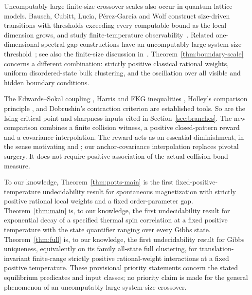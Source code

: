 Uncomputably large finite-size crossover scales also occur in quantum lattice models. Bausch, Cubitt, Lucia, P\'erez-Garc\'ia and Wolf construct size-driven transitions with thresholds exceeding every computable bound as the local dimension grows, and study finite-temperature observability~\cite{BCLPW2018}. Related one-dimensional spectral-gap constructions have an uncomputably large system-size threshold~\cite{BCLPG2020}; see also the finite-size discussion in~\cite{CPGW}. Theorem~\ref{thm:boundary-scale} concerns a different combination: strictly positive classical rational weights, uniform disordered-state bulk clustering, and the oscillation over all visible and hidden boundary conditions.

The Edwards--Sokal coupling \cite{ES}, Harris and FKG inequalities \cite{Harris,FKG}, Holley's comparison principle \cite{Holley}, and Dobrushin's contraction criterion \cite{Dobrushin,Rebeschini} are established tools. So are the Ising critical-point and sharpness inputs cited in Section~\ref{sec:branches}. The new comparison combines a finite collision witness, a positive closed-pattern reward and a covariance interpolation. The reward acts as an essential diminishment, in the sense motivating \cite{AG,BGK} and \cite[Conjecture 1 and Theorems 2--3]{BBR}; our anchor-covariance interpolation replaces pivotal surgery. It does not require positive association of the actual collision bond measure.

To our knowledge, Theorem~\ref{thm:potts-main} is the first fixed-positive-temperature undecidability result for spontaneous magnetization with strictly positive rational local weights and a fixed order-parameter gap. Theorem~\ref{thm:main} is, to our knowledge, the first undecidability result for exponential decay of a specified thermal spin correlation at a fixed positive temperature with the state quantifier ranging over every Gibbs state. Theorem~\ref{thm:full} is, to our knowledge, the first undecidability result for Gibbs uniqueness, equivalently on its family all-state full clustering, for translation-invariant finite-range strictly positive rational-weight interactions at a fixed positive temperature. These provisional priority statements concern the stated equilibrium predicates and input classes; no priority claim is made for the general phenomenon of an uncomputably large system-size crossover.

